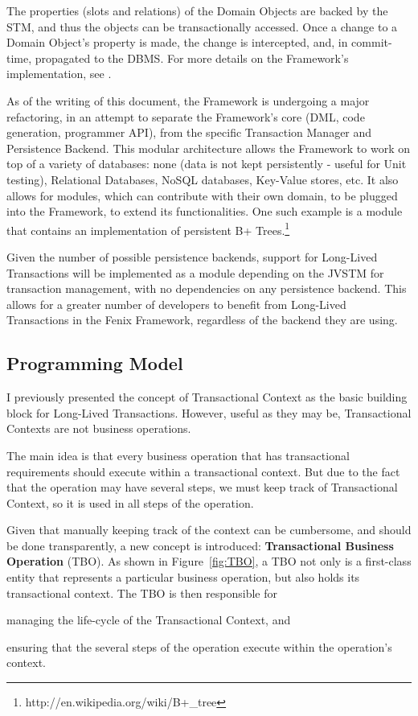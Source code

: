 \documentclass{llncs}
\begin{document}
The properties (slots and relations) of the Domain Objects are backed
by the STM, and thus the objects can be transactionally accessed. Once
a change to a Domain Object's property is made, the change is
intercepted, and, in commit-time, propagated to the DBMS. For more
details on the Framework's implementation, see
\cite{fernandes2011strict}.

As of the writing of this document, the Framework is undergoing a
major refactoring, in an attempt to separate the Framework's core
(DML, code generation, programmer API), from the specific Transaction
Manager and Persistence Backend. This modular architecture allows the
Framework to work on top of a variety of databases: none (data is not
kept persistently - useful for Unit testing), Relational Databases,
NoSQL databases, Key-Value stores, etc. It also allows for modules,
which can contribute with their own domain, to be plugged into the
Framework, to extend its functionalities. One such example is a module
that contains an implementation of persistent B+
Trees.\footnote{http://en.wikipedia.org/wiki/B+\_tree}

Given the number of possible persistence backends, support for
Long-Lived Transactions will be implemented as a module depending on
the JVSTM for transaction management, with no dependencies on any
persistence backend. This allows for a greater number of developers to
benefit from Long-Lived Transactions in the Fenix Framework,
regardless of the backend they are using.

\subsection{Programming Model}

I previously presented the concept of Transactional Context as the
basic building block for Long-Lived Transactions. However, useful as
they may be, Transactional Contexts are not business operations.

The main idea is that every business operation that has transactional
requirements should execute within a transactional context. But due to
the fact that the operation may have several steps, we must keep track
of Transactional Context, so it is used in all steps of the operation.

Given that manually keeping track of the context can be cumbersome,
and should be done transparently, a new concept is introduced: {\bf
  Transactional Business Operation} (TBO). As shown in
Figure~\ref{fig:TBO}, a TBO not only is a first-class entity that
represents a particular business operation, but also holds its
transactional context. The TBO is then responsible for
\begin{inparaenum}[\itshape 1\upshape)]
\item managing the life-cycle of the Transactional Context, and
\item ensuring that the several steps of the operation execute within
  the operation's context.
\end{inparaenum}
\end{document}
